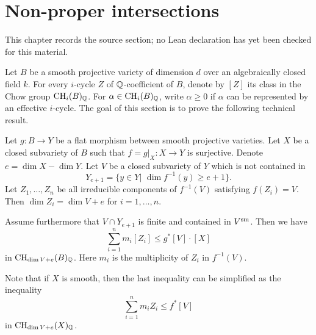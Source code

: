 \chapter{Non-proper intersections}
\label{geometric-bogomolov-conjecture-arbitrary-characteristics-chapter-02}

\begin{remark}
\label{geometric-bogomolov-conjecture-arbitrary-characteristics-chapter-02-source}
This chapter records the source section; no Lean declaration has yet been checked for this material.
\notready
\end{remark}

\label{sec nonproper}

Let $B$ be a smooth projective variety of dimension $d$ over an algebraically closed field $k$.
For every $i$-cycle $Z$ of ${\mathbb Q}$-coefficient of $B$,  denote by $[Z]$ its class in the Chow group
${\rm CH}_i(B)_{{\mathbb Q}}$. For $\alpha\in {\rm CH}_i(B)_{{\mathbb Q}}$, write $\alpha\geq 0$ if $\alpha$ can be represented by an effective $i$-cycle.
The goal of this section is to prove the following technical result.

\begin{pro}\label{prostrleqtot}
Let $g: B\to Y$ be a flat morphism between smooth projective varieties.
Let $X$ be a closed subvariety of $B$ such that $f=g|_X: X\to Y$ is surjective.
Denote $e=\dim X-\dim Y$.
Let $V$ be a closed subvariety of $Y$ which is not contained in
$$Y_{e+1}=\{y\in Y|\,\, \dim f^{-1}(y)\geq e+1\}.$$
Let $Z_1, \dots, Z_n$ be all irreducible components of $f^{-1}(V)$ satisfying
$f(Z_i)=V.$ Then $\dim Z_i=\dim V+e$ for $i=1,\dots,n$.

Assume furthermore that $V\cap Y_{e+1}$ is finite and contained in $V^{{\rm sm}}$.
Then we have
$$\sum_{i=1}^n m_i[Z_i]\leq g^*[V]\cdot [X]$$
in ${\rm CH}_{\dim V+e}(B)_{\mathbb Q}$.
Here $m_i$ is the multiplicity of $Z_i$ in $f^{-1}(V).$
\end{pro}

Note that if $X$ is smooth, then the last inequality can be simplified as the inequality
$$\sum_{i=1}^n m_iZ_i\leq f^*[V]$$
in ${\rm CH}_{\dim V+e}(X)_{\mathbb Q}$.


